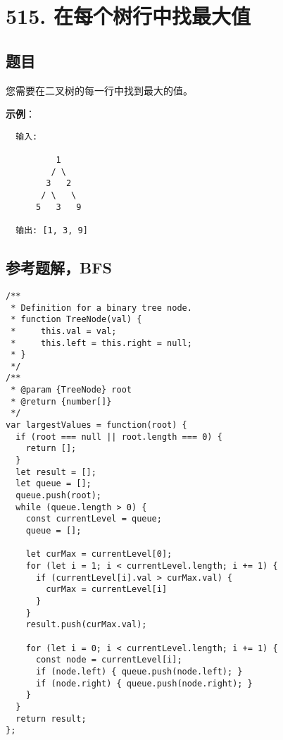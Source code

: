 \newpage
\section{515. 在每个树行中找最大值}
\label{leetcode:515}

\subsection{题目}

您需要在二叉树的每一行中找到最大的值。

\textbf{示例}：

\begin{verbatim}
  输入: 

          1
         / \
        3   2
       / \   \  
      5   3   9 

  输出: [1, 3, 9]
\end{verbatim}

\subsection{参考题解，BFS}

\begin{verbatim}
/**
 * Definition for a binary tree node.
 * function TreeNode(val) {
 *     this.val = val;
 *     this.left = this.right = null;
 * }
 */
/**
 * @param {TreeNode} root
 * @return {number[]}
 */
var largestValues = function(root) {
  if (root === null || root.length === 0) {
    return [];
  }
  let result = [];
  let queue = [];
  queue.push(root);
  while (queue.length > 0) {
    const currentLevel = queue;
    queue = [];

    let curMax = currentLevel[0];
    for (let i = 1; i < currentLevel.length; i += 1) {
      if (currentLevel[i].val > curMax.val) {
        curMax = currentLevel[i]
      }
    }
    result.push(curMax.val);

    for (let i = 0; i < currentLevel.length; i += 1) {
      const node = currentLevel[i];
      if (node.left) { queue.push(node.left); }
      if (node.right) { queue.push(node.right); }
    }
  }
  return result;
};
\end{verbatim}
